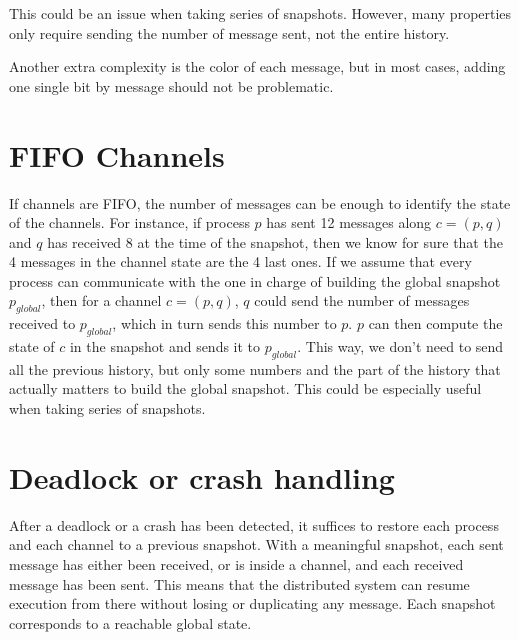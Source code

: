 \documentclass{article}
\begin{document}
This could be an issue when taking series of snapshots. However, many properties only require sending the number of message sent, not the entire history.

Another extra complexity is the color of each message, but in most cases, adding one single bit by message should not be problematic.

\section{FIFO Channels}

If channels are FIFO, the number of messages can be enough to identify the state of the channels.
For instance, if process $p$ has sent 12 messages along $c=(p,q)$ and $q$ has received 8 at the time of the snapshot, then we know for sure that the 4 messages in the channel state are the 4 last ones.
If we assume that every process can communicate with the one in charge of building the global snapshot $p_{global}$, then for a channel $c=(p,q)$, $q$ could send the number of messages received to $p_{global}$, which in turn sends this number to $p$. $p$ can then compute the state of $c$ in the snapshot and sends it to $p_{global}$.
This way, we don't need to send all the previous history, but only some numbers and the part of the history that actually matters to build the global snapshot. This could be especially useful when taking series of snapshots.

\section{Deadlock or crash handling}

After a deadlock or a crash has been detected, it suffices to restore each process and each channel to a previous snapshot.
With a meaningful snapshot, each sent message has either been received, or is inside a channel, and each received message has been sent. This means that the distributed system can resume execution from there without losing or duplicating any message.
Each snapshot corresponds to a reachable global state.
\end{document}
